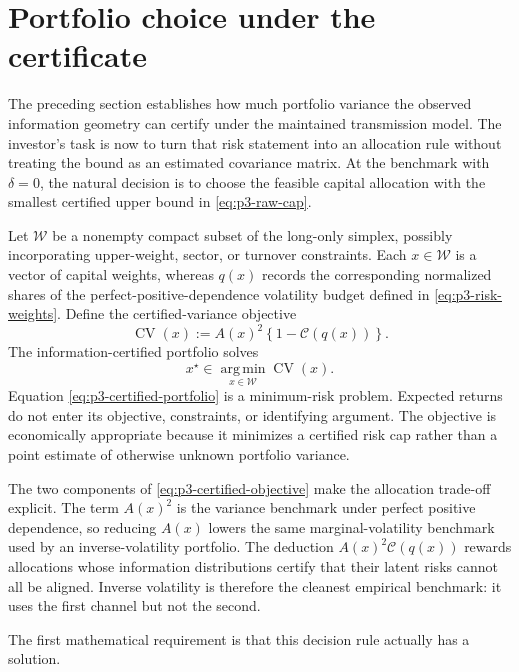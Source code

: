 \section{Portfolio choice under the certificate}\label{sec:portfolio-choice}

The preceding section establishes how much portfolio variance the
observed information geometry can certify under the maintained
transmission model.
The investor's task is now to turn that risk statement into an
allocation rule without treating the bound as an estimated covariance matrix.
At the benchmark with $\delta=0$, the natural decision is to choose the
feasible capital allocation with the smallest certified upper bound in
\eqref{eq:p3-raw-cap}.

Let $\mathcal W$ be a nonempty compact subset of the long-only simplex,
possibly incorporating upper-weight, sector, or turnover constraints.
Each $x\in\mathcal W$ is a vector of capital weights, whereas $q(x)$
records the corresponding normalized shares of the
perfect-positive-dependence volatility budget defined in
\eqref{eq:p3-risk-weights}.
Define the certified-variance objective
\begin{equation}\label{eq:p3-certified-objective}
  \operatorname{CV}(x)
  :=A(x)^2\left\{1-\mathcal C(q(x))\right\}.
\end{equation}
The information-certified portfolio solves
\begin{equation}\label{eq:p3-certified-portfolio}
  x^{\star}\in
  \operatorname*{arg\,min}_{x\in\mathcal W}\operatorname{CV}(x).
\end{equation}
Equation \eqref{eq:p3-certified-portfolio} is a minimum-risk problem.
Expected returns do not enter its objective, constraints, or identifying
argument.
The objective is economically appropriate because it minimizes a
certified risk cap rather than a point estimate of otherwise unknown
portfolio variance.

The two components of \eqref{eq:p3-certified-objective} make the
allocation trade-off explicit.
The term $A(x)^2$ is the variance benchmark under perfect positive
dependence, so reducing $A(x)$ lowers the same marginal-volatility
benchmark used by an inverse-volatility portfolio.
The deduction $A(x)^2\mathcal C(q(x))$ rewards allocations whose
information distributions certify that their latent risks cannot all be aligned.
Inverse volatility is therefore the cleanest empirical benchmark: it
uses the first channel but not the second.

The first mathematical requirement is that this decision rule
actually has a solution.

